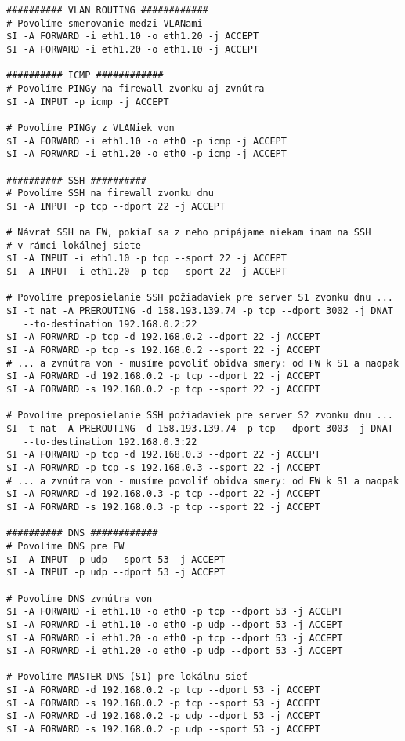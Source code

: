 {\begin{small}
\begin{verbatim}
########## VLAN ROUTING ############
# Povolíme smerovanie medzi VLANami
$I -A FORWARD -i eth1.10 -o eth1.20 -j ACCEPT
$I -A FORWARD -i eth1.20 -o eth1.10 -j ACCEPT

########## ICMP ############
# Povolíme PINGy na firewall zvonku aj zvnútra
$I -A INPUT -p icmp -j ACCEPT

# Povolíme PINGy z VLANiek von
$I -A FORWARD -i eth1.10 -o eth0 -p icmp -j ACCEPT
$I -A FORWARD -i eth1.20 -o eth0 -p icmp -j ACCEPT

########## SSH ##########
# Povolíme SSH na firewall zvonku dnu
$I -A INPUT -p tcp --dport 22 -j ACCEPT

# Návrat SSH na FW, pokiaľ sa z neho pripájame niekam inam na SSH
# v rámci lokálnej siete
$I -A INPUT -i eth1.10 -p tcp --sport 22 -j ACCEPT
$I -A INPUT -i eth1.20 -p tcp --sport 22 -j ACCEPT

# Povolíme preposielanie SSH požiadaviek pre server S1 zvonku dnu ...
$I -t nat -A PREROUTING -d 158.193.139.74 -p tcp --dport 3002 -j DNAT
   --to-destination 192.168.0.2:22
$I -A FORWARD -p tcp -d 192.168.0.2 --dport 22 -j ACCEPT
$I -A FORWARD -p tcp -s 192.168.0.2 --sport 22 -j ACCEPT
# ... a zvnútra von - musíme povoliť obidva smery: od FW k S1 a naopak
$I -A FORWARD -d 192.168.0.2 -p tcp --dport 22 -j ACCEPT
$I -A FORWARD -s 192.168.0.2 -p tcp --sport 22 -j ACCEPT

# Povolíme preposielanie SSH požiadaviek pre server S2 zvonku dnu ...
$I -t nat -A PREROUTING -d 158.193.139.74 -p tcp --dport 3003 -j DNAT
   --to-destination 192.168.0.3:22
$I -A FORWARD -p tcp -d 192.168.0.3 --dport 22 -j ACCEPT
$I -A FORWARD -p tcp -s 192.168.0.3 --sport 22 -j ACCEPT
# ... a zvnútra von - musíme povoliť obidva smery: od FW k S1 a naopak
$I -A FORWARD -d 192.168.0.3 -p tcp --dport 22 -j ACCEPT
$I -A FORWARD -s 192.168.0.3 -p tcp --sport 22 -j ACCEPT

########## DNS ############
# Povolíme DNS pre FW
$I -A INPUT -p udp --sport 53 -j ACCEPT
$I -A INPUT -p udp --dport 53 -j ACCEPT

# Povolíme DNS zvnútra von
$I -A FORWARD -i eth1.10 -o eth0 -p tcp --dport 53 -j ACCEPT
$I -A FORWARD -i eth1.10 -o eth0 -p udp --dport 53 -j ACCEPT
$I -A FORWARD -i eth1.20 -o eth0 -p tcp --dport 53 -j ACCEPT
$I -A FORWARD -i eth1.20 -o eth0 -p udp --dport 53 -j ACCEPT

# Povolíme MASTER DNS (S1) pre lokálnu sieť
$I -A FORWARD -d 192.168.0.2 -p tcp --dport 53 -j ACCEPT
$I -A FORWARD -s 192.168.0.2 -p tcp --sport 53 -j ACCEPT
$I -A FORWARD -d 192.168.0.2 -p udp --dport 53 -j ACCEPT
$I -A FORWARD -s 192.168.0.2 -p udp --sport 53 -j ACCEPT


\end{verbatim}
\end{small}}
